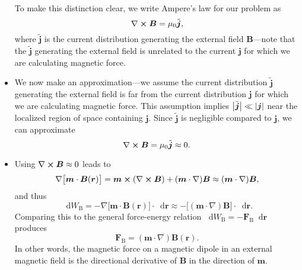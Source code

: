 \documentclass[11pt, a4paper]{article}
\newcommand{\diff}{\mathop{}\!\mathrm{d}} %
\renewcommand{\vec}[1]{\bm{#1}} %
\renewcommand{\t}[1]{\tilde{#1}} %
\renewcommand{\r}{\vec{r}}
\newcommand{\B}{\vec{B}} %
\newcommand{\mm}{\mu_{0}}  %
\newcommand{\m}{\vec{m}}  %
\renewcommand{\j}{\vec{j}}  %
\renewcommand{\curl}{\nabla \cross}
\renewcommand{\grad}{\nabla}
\begin{document}
\begin{itemize}
	To make this distinction clear, we write Ampere's law for our problem as 
	\begin{equation*}
		\curl \B = \mm \t{\j},
	\end{equation*}
	where $ \t{\j} $ is the current distribution generating the external field $ \B $---note that the $ \t{\j} $ generating the external field is unrelated to the current $ \j $ for which we are calculating magnetic force.
	
	\item We now make an approximation---we assume the current distribution $ \t{\j} $ generating the external field is far from the current distribution $ \j $ for which we are calculating magnetic force. This assumption implies $ \big |\t{\j}\big | \ll \abs{\j} $ near the localized region of space containing $ \j $. Since $ \t{\j} $ is negligible compared to $ \j $, we can approximate
	\begin{equation*}
		\curl \B = \mm \t{\j} \approx 0.
	\end{equation*}

	\item Using $ \curl \B \approx 0 $ leads to
	\begin{equation*}
		\grad\big[\m \cdot \B(\r)\big] = \m \cross (\curl \B) + (\m \cdot \grad)\B \approx (\m \cdot \grad)\B,
	\end{equation*}
	and thus
	\begin{equation*}
		\diff W_{\text{B}} = - \grad\big[\m \cdot \B(\r)\big]\cdot  \diff \r \approx - \big[ (\m \cdot \grad)\B\big]\cdot \diff \r.
	\end{equation*}
	Comparing this to the general force-energy relation $ \diff W_{\text{B}} = - \vec{F}_{\text{B}}\diff \r $ produces
	\begin{equation*}
		\vec{F}_{\text{B}} = (\m \cdot \grad)\B(\r).
	\end{equation*}
	In other words, the magnetic force on a magnetic dipole in an external magnetic field is the directional derivative of $ \B $ in the direction of $ \m $.
\end{itemize}
\end{document}
